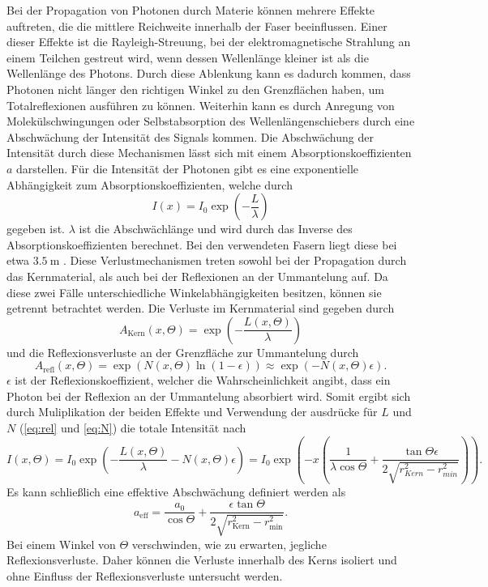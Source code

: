 Bei der Propagation von Photonen durch Materie können mehrere Effekte auftreten, die die mittlere Reichweite innerhalb der Faser beeinflussen.
Einer dieser Effekte ist die Rayleigh-Streuung, bei der elektromagnetische Strahlung an einem Teilchen gestreut wird, wenn dessen Wellenlänge
kleiner ist als die Wellenlänge des Photons. Durch diese Ablenkung kann es dadurch kommen, dass Photonen nicht länger den richtigen Winkel zu den
Grenzflächen haben, um Totalreflexionen ausführen zu können. Weiterhin kann es durch Anregung von Molekülschwingungen oder Selbstabsorption
des Wellenlängenschiebers durch eine Abschwächung der Intensität des Signals kommen. Die Abschwächung der Intensität durch diese Mechanismen lässt sich
mit einem Absorptionskoeffizienten $a$ darstellen. Für die Intensität der Photonen gibt es eine exponentielle Abhängigkeit
zum Absorptionskoeffizienten, welche durch
\begin{equation}
    I(x) = I_0 \exp\left(-\frac{L}{\lambda}\right)
\end{equation}
gegeben ist. $\lambda$ ist die Abschwächlänge und wird durch das Inverse des Absorptionskoeffizienten berechnet. Bei den verwendeten Fasern
liegt diese bei etwa $\qty{3.5}{\metre}$ \cite{SciFi_Versuch}. Diese Verlustmechanismen treten sowohl bei der Propagation durch das Kernmaterial,
als auch bei der Reflexionen an der Ummantelung auf. Da diese zwei Fälle unterschiedliche Winkelabhängigkeiten besitzen, können sie
getrennt betrachtet werden. Die Verluste im Kernmaterial sind gegeben durch
\begin{equation}
    A_{\text{Kern}}(x, \Theta) = \exp{\left(- \frac{L(x,\Theta)}{\lambda}\right)}
\end{equation}
und die Reflexionsverluste an der Grenzfläche zur Ummantelung durch
\begin{equation}
    A_{\text{refl}}(x, \Theta) = \exp{\left(N(x,\Theta) \ln{(1-\epsilon)}\right)} \approx \exp{\left( -N(x,\Theta) \epsilon \right)}.
\end{equation}
$\epsilon$ ist der Reflexionskoeffizient, welcher die Wahrscheinlichkeit angibt, dass ein Photon bei der Reflexion an der Ummantelung absorbiert wird.
Somit ergibt sich durch Muliplikation der beiden Effekte und Verwendung der ausdrücke für $L$ und $N$ (\autoref{eq:rel} und \ref{eq:N}) die totale Intensität nach
\begin{equation}
    I(x,\Theta) = I_0  \exp{\left( - \frac{L(x,\Theta)}{\lambda}-N(x,\Theta) \epsilon \right)} = I_0  \exp{\left(-x \left( \frac{1}{\lambda\cos{\Theta}}+\frac{ \tan{\Theta}\epsilon}{2 \sqrt{r^2_{Kern} - r^2_{min}}} \right) \right)}.
\end{equation}
Es kann schließlich eine effektive Abschwächung definiert werden als
\begin{equation}
    \label{eq:absorption}
    a_{\text{eff}} = \frac{a_0}{\cos{\Theta}} + \frac{\epsilon \tan{\Theta}}{2 \sqrt{r^2_{\text{Kern}} - r^2_{\text{min}}}}.
\end{equation}
Bei einem Winkel von $\Theta$ verschwinden, wie zu erwarten, jegliche Reflexionsverluste. Daher können die Verluste innerhalb des Kerns
isoliert und ohne Einfluss der Reflexionsverluste untersucht werden.

